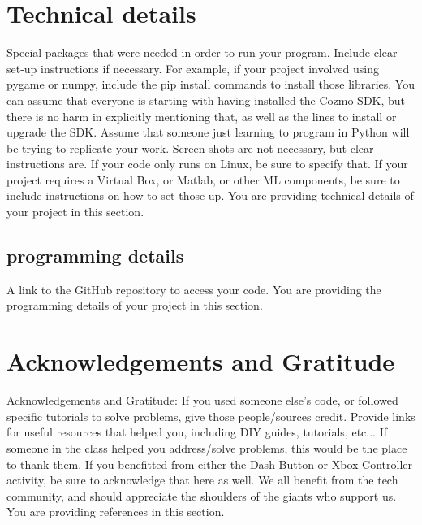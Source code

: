\documentclass[12pt,a4paper]{article}
\begin{document}
\section{Technical details}
Special packages that were needed in order to run your program.  Include clear set-up instructions if necessary.  For example, if your project involved using pygame or numpy, include the pip install commands to install those libraries.  You can assume that everyone is starting with having installed the Cozmo SDK, but there is no harm in explicitly mentioning that, as well as the lines to install or upgrade the SDK.  Assume that someone just learning to program in Python will be trying to replicate your work.  Screen shots are not necessary, but clear instructions are.  If your code only runs on Linux, be sure to specify that.  If your project requires a Virtual Box, or Matlab, or other ML components, be sure to include instructions on how to set those up.  You are providing technical details of your project in this section.

\subsection{programming details}

A link to the GitHub repository to access your code.  You are providing the programming details of your project in this section.

\section{Acknowledgements and Gratitude}

Acknowledgements and Gratitude: If you used someone else's code, or followed specific tutorials to solve problems, give those people/sources credit.  Provide links for useful resources that helped you, including DIY guides, tutorials, etc...  If someone in the class helped you address/solve problems, this would be the place to thank them.  If you benefitted from either the Dash Button or Xbox Controller activity, be sure to acknowledge that here as well.  We all benefit from the tech community, and should appreciate the shoulders of the giants who support us.  You are providing references in this section.





\end{document}
